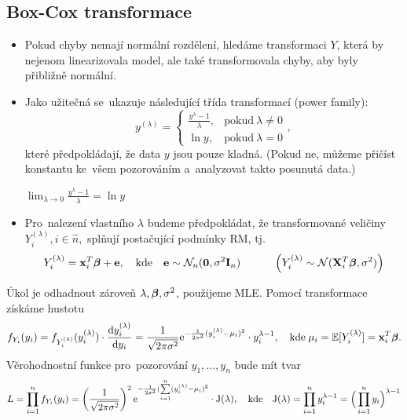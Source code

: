\subsection{Box-Cox transformace}
\begin{itemize}
\item Pokud chyby nemají normální rozdělení, hledáme transformaci $Y$, která by nejenom linearizovala model, ale také transformovala chyby, aby byly přibližně normální.
\item Jako užitečná se~ukazuje následující třída transformací (power family):
 $$
 y^{(\lambda)} = \begin{cases}
      \frac{y^{\lambda}-1}{\lambda}, & \text{pokud}\ \lambda \neq 0 \\
      \ln y, & \text{pokud}\ \lambda = 0
    \end{cases},
 $$
které předpokládají, že data $y$ jsou pouze kladná. (Pokud ne, můžeme přičíst konstantu ke~všem pozorováním a~analyzovat takto posunutá data.)
\begin{remark}
 $\lim_{\lambda \rightarrow 0}  \frac{y^{\lambda}-1}{\lambda} = \ln y$
\end{remark}
\item Pro~nalezení vlastního $\lambda$ budeme předpokládat, že transformované veličiny \\ $Y_i^{(\lambda)}, i\in\widehat{n},$ splňují postačující podmínky RM, tj.
 $$
 Y_i^{(\lambda)} = \mathbf{x}_i^T \boldsymbol{\beta} + \mathbf{e}, \quad \text{kde} \quad \mathbf{e} \sim \mathcal{N}_n (\boldsymbol{0},\sigma^2 \textbf{I}_{n}) \quad \quad \quad \left(Y_i^{(\lambda)} \sim \mathcal{N} (\mathbf{X}_i^T \boldsymbol{\beta}, \sigma^2) \right)
 $$
\end{itemize}
Úkol je odhadnout zároveň $\lambda, \boldsymbol{\beta}, \sigma^2$, použijeme MLE. Pomocí transformace získáme hustotu
 $$
  f_{Y_i}(y_i) = f_{Y_i^{(\lambda)}}(y_i^{(\lambda)}) \cdot \frac{\mathrm{d} y_i^{(\lambda)}}{\mathrm{d} y_i} = \frac{1}{\sqrt{2 \pi \sigma^2}} \mathrm{e}^{-\frac{1}{2 \sigma^2}(y_i^{(\lambda)} - \mu_i)^2} \cdot y_i^{\lambda - 1}, \quad \text{kde} \; \mu_i = \mathbb{E}[Y_i^{(\lambda)}] = \mathbf{x}_i^T \boldsymbol{\beta}.
 $$
Věrohodnostní funkce pro~pozorování $y_1,...,y_n$ bude mít tvar
 $$
  L = \prod_{i = 1}^nf_{Y_i}(y_i) = \left(\frac{1}{\sqrt{2 \pi \sigma^2}} \right)^2 \mathrm{e}^{-\frac{1}{2 \sigma^2}(\sum\limits_{i=1}^{n} (y_i^{(\lambda)} - \mu_i)^2} \cdot \mathrm{J}(\lambda), \quad \text{kde} \quad \mathrm{J}(\lambda) = \prod_{i = 1}^n y_i^{\lambda - 1} = \Big(\prod_{i = 1}^n y_i \Big)^{\lambda - 1}
 $$


